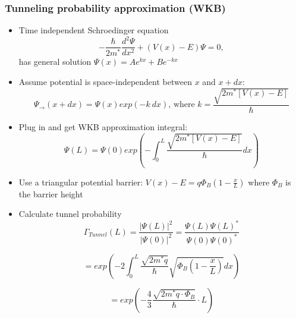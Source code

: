 \documentclass{beamer}
\begin{document}
\begin{frame}\frametitle{Tunneling probability approximation (WKB)}
\begin{overprint}
\begin{itemize}
\item Time independent Schroedinger equation
\begin{equation*}
-\frac{\hbar}{2m^{*}}\frac{d^2\Psi}{dx^2} + (V(x)-E)\Psi = 0,
\end{equation*}
has general solution $\Psi(x)=A e^{kx}+B e^{-kx}$
\item Assume potential is space-independent between $x$ and $x+dx$:
\begin{equation*}
\Psi_{\rightarrow}(x+dx) = \Psi(x)  exp(-k\ dx) \text{,  where  } k=\frac{\sqrt{2m^*[V(x)-E]}}{\hbar}
\end{equation*}
\item Plug in and get WKB approximation integral:
\begin{equation*}
\Psi(L) = \Psi(0) exp(-\int_{0}^{L} \frac{\sqrt{2m^*[V(x)-E]}}{\hbar} dx)
\end{equation*}
\end{itemize}

\begin{itemize}
\item Use a triangular potential barrier: $V(x)-E = q\Phi_B(1 - \frac{x}{L})$ 
where $\Phi_B$ is the barrier height%
\item Calculate tunnel probability
\begin{equation*}
\Gamma_{Tunnel}(L) = \frac{\lvert\Psi(L)\rvert^2}{\lvert\Psi(0)\rvert^2}=\frac{\Psi(L)\Psi(L)^{*}}{\Psi(0)\Psi(0)^{*}}
\end{equation*}

\begin{equation*}
 = exp(-2\int_{0}^{L} \frac{\sqrt{2m^*q}}{\hbar}\sqrt{\Phi_B(1-\frac{x}{L})} dx)
\end{equation*}


 \begin{equation*}
 = exp(- \frac{4}{3}\frac{\sqrt{2m^*q\cdot \Phi_B}}{\hbar}\cdot L)
\end{equation*}


\end{itemize}
\end{overprint}
\end{frame}
\end{document}
